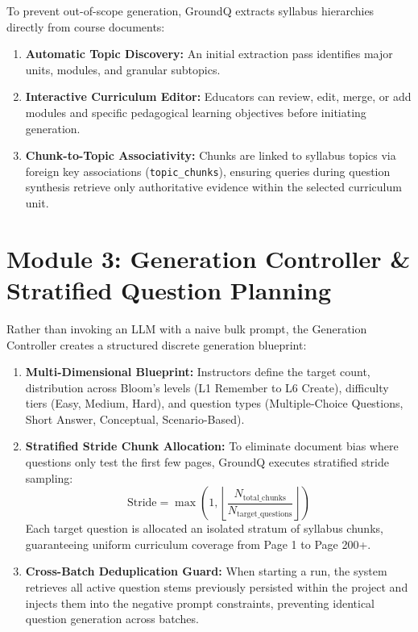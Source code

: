 \documentclass[12pt,a4paper]{report}
\begin{document}
To prevent out-of-scope generation, GroundQ extracts syllabus hierarchies directly from course documents:
\begin{enumerate}
    \item \textbf{Automatic Topic Discovery:} An initial extraction pass identifies major units, modules, and granular subtopics.
    \item \textbf{Interactive Curriculum Editor:} Educators can review, edit, merge, or add modules and specific pedagogical learning objectives before initiating generation.
    \item \textbf{Chunk-to-Topic Associativity:} Chunks are linked to syllabus topics via foreign key associations (\texttt{topic\_chunks}), ensuring queries during question synthesis retrieve only authoritative evidence within the selected curriculum unit.
\end{enumerate}

\section{Module 3: Generation Controller \& Stratified Question Planning}

Rather than invoking an LLM with a naive bulk prompt, the Generation Controller creates a structured discrete generation blueprint:
\begin{enumerate}
    \item \textbf{Multi-Dimensional Blueprint:} Instructors define the target count, distribution across Bloom's levels (L1 Remember to L6 Create), difficulty tiers (Easy, Medium, Hard), and question types (Multiple-Choice Questions, Short Answer, Conceptual, Scenario-Based).
    \item \textbf{Stratified Stride Chunk Allocation:} To eliminate document bias where questions only test the first few pages, GroundQ executes stratified stride sampling:
    \begin{equation}
        \text{Stride} = \max\left(1, \left\lfloor \frac{N_{\text{total\_chunks}}}{N_{\text{target\_questions}}} \right\rfloor\right)
    \end{equation}
    Each target question is allocated an isolated stratum of syllabus chunks, guaranteeing uniform curriculum coverage from Page 1 to Page 200+.
    \item \textbf{Cross-Batch Deduplication Guard:} When starting a run, the system retrieves all active question stems previously persisted within the project and injects them into the negative prompt constraints, preventing identical question generation across batches.
\end{enumerate}
\end{document}
